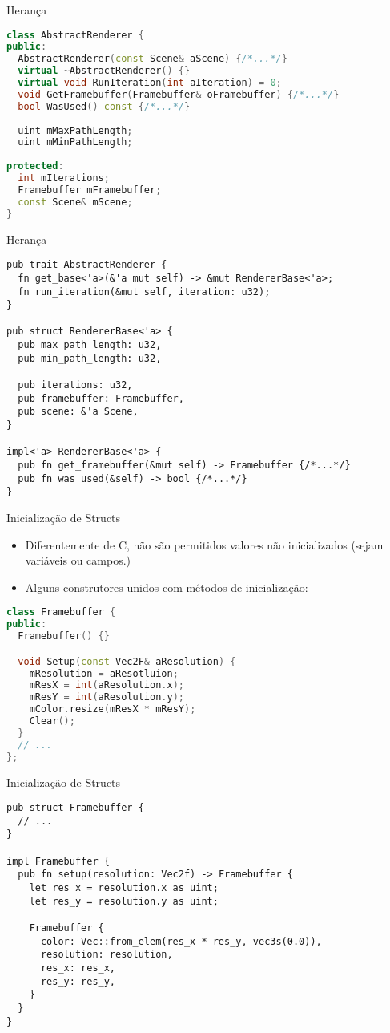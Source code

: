\documentclass{beamer}
\def\Cpp{{C\nolinebreak[4]\raisebox{.2ex}{\scriptsize\bf++}}}
\begin{document}
\begin{frame}[fragile]{Herança}
	\begin{lstlisting}[language=C++]
class AbstractRenderer {
public:
  AbstractRenderer(const Scene& aScene) {/*...*/}
  virtual ~AbstractRenderer() {}
  virtual void RunIteration(int aIteration) = 0;
  void GetFramebuffer(Framebuffer& oFramebuffer) {/*...*/}
  bool WasUsed() const {/*...*/}
	
  uint mMaxPathLength;
  uint mMinPathLength;
	
protected:
  int mIterations;
  Framebuffer mFramebuffer;
  const Scene& mScene;
}
	\end{lstlisting}
\end{frame}

\begin{frame}[fragile]{Herança}
	\begin{lstlisting}
pub trait AbstractRenderer {
  fn get_base<'a>(&'a mut self) -> &mut RendererBase<'a>;
  fn run_iteration(&mut self, iteration: u32);
}

pub struct RendererBase<'a> {
  pub max_path_length: u32,
  pub min_path_length: u32,

  pub iterations: u32,
  pub framebuffer: Framebuffer,
  pub scene: &'a Scene,
}

impl<'a> RendererBase<'a> {
  pub fn get_framebuffer(&mut self) -> Framebuffer {/*...*/}
  pub fn was_used(&self) -> bool {/*...*/}
}
	\end{lstlisting}
\end{frame}

\begin{frame}[fragile]{Inicialização de Structs}
	\begin{itemize}
		\item Diferentemente de \Cpp, não são permitidos valores não inicializados (sejam variáveis ou campos.)
		\item Alguns construtores unidos com métodos de inicialização:
	\end{itemize}
	\begin{lstlisting}[language=C++]
class Framebuffer {
public:
  Framebuffer() {}

  void Setup(const Vec2F& aResolution) {
    mResolution = aResotluion;
    mResX = int(aResolution.x);
    mResY = int(aResolution.y);
    mColor.resize(mResX * mResY);
    Clear();
  }
  // ...
};
	\end{lstlisting}
\end{frame}
\begin{frame}[fragile]{Inicialização de Structs}
	\begin{lstlisting}
pub struct Framebuffer {
  // ...
}

impl Framebuffer {
  pub fn setup(resolution: Vec2f) -> Framebuffer {
    let res_x = resolution.x as uint;
    let res_y = resolution.y as uint;
    
    Framebuffer {
      color: Vec::from_elem(res_x * res_y, vec3s(0.0)),
      resolution: resolution,
      res_x: res_x,
      res_y: res_y,
    }
  }
}
	\end{lstlisting}
\end{frame}
\end{document}
